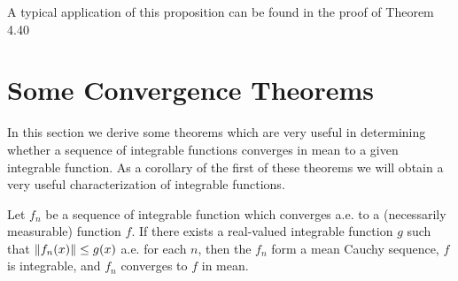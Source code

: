 A typical application of this proposition can be found in the proof of Theorem 4.40

\section{Some Convergence Theorems}

In this section we derive some theorems which are very useful in determining whether a sequence of integrable functions converges in mean to a given integrable function. As a corollary of the first of these theorems we will obtain a very useful characterization of integrable functions.

\begin{theorem}
Let $f_n$ be a sequence of integrable function which converges a.e. to a (necessarily measurable) function $f$. If there exists a real-valued integrable function $g$ such that $\norm{f_n(x)}\leq g(x)$ a.e. for each $n$, then the $f_n$ form a mean Cauchy sequence, $f$ is integrable, and $f_n$ converges to $f$ in mean.
\end{theorem}

